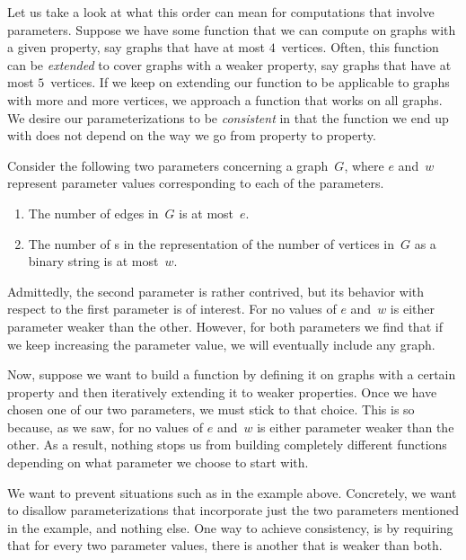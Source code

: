 Let us take a look at what this order can mean for computations that involve parameters.
Suppose we have some function that we can compute on graphs with a given property, say graphs that have at most $4$~vertices.
Often, this function can be \emph{extended} to cover graphs with a weaker property, say graphs that have at most $5$~vertices.
If we keep on extending our function to be applicable to graphs with more and more vertices, we approach a function that works on all graphs.
We desire our parameterizations to be \emph{consistent} in that the function we end up with does not depend on the way we go from property to property.

\begin{example}
\label{ex:inconsistent}%
  Consider the following two parameters concerning a graph~$G$, where $e$ and~$w$ represent parameter values corresponding to each of the parameters.
  \begin{enumerate}
  \item The number of edges in~$G$ is at most~$e$.
  \item The number of s in the representation of the number of vertices in~$G$ as a binary string is at most~$w$.
  \end{enumerate}
  Admittedly, the second parameter is rather contrived, but its behavior with respect to the first parameter is of interest.
  For no values of $e$ and~$w$ is either parameter weaker than the other.
  However, for both parameters we find that if we keep increasing the parameter value, we will eventually include any graph.

  Now, suppose we want to build a function by defining it on graphs with a certain property and then iteratively extending it to weaker properties.
  Once we have chosen one of our two parameters, we must stick to that choice.
  This is so because, as we saw, for no values of $e$ and~$w$ is either parameter weaker than the other.
  As a result, nothing stops us from building completely different functions depending on what parameter we choose to start with.
\end{example}

We want to prevent situations such as in the example above.
Concretely, we want to disallow parameterizations that incorporate just the two parameters mentioned in the example, and nothing else.
One way to achieve consistency, is by requiring that for every two parameter values, there is another that is weaker than both.

